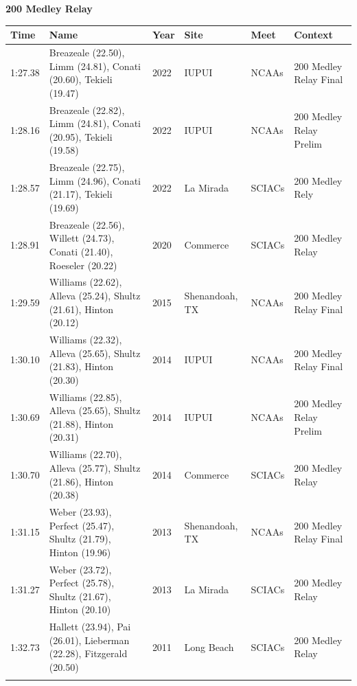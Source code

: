 \noindent\begin{minipage}[t]{0.98\textwidth}
\centering
\textbf{\textcolor{teamprimary}{200 Medley Relay}}\par
\vspace{0.5em}
\centering
\small
\renewcommand{\arraystretch}{1.0}
\setlength{\tabcolsep}{4pt}
\begin{tabular}{@{}p{2.0cm}p{3.2cm}p{1.2cm}p{2.0cm}p{2.0cm}p{2.5cm}@{}}
\toprule
\textbf{Time} & \textbf{Name} & \textbf{Year} & \textbf{Site} & \textbf{Meet} & \textbf{Context} \\
\midrule
1:27.38 & Breazeale (22.50), Limm (24.81), Conati (20.60), Tekieli (19.47) & 2022 & IUPUI & NCAAs & 200 Medley Relay Final \\
1:28.16 & Breazeale (22.82), Limm (24.81), Conati (20.95), Tekieli (19.58) & 2022 & IUPUI & NCAAs & 200 Medley Relay Prelim \\
1:28.57 & Breazeale (22.75), Limm (24.96), Conati (21.17), Tekieli (19.69) & 2022 & La Mirada & SCIACs & 200 Medley Rely \\
1:28.91 & Breazeale (22.56), Willett (24.73), Conati (21.40), Roeseler (20.22) & 2020 & Commerce & SCIACs & 200 Medley Relay \\
1:29.59 & Williams (22.62), Alleva (25.24), Shultz (21.61), Hinton (20.12) & 2015 & Shenandoah, TX & NCAAs & 200 Medley Relay Final \\
1:30.10 & Williams (22.32), Alleva (25.65), Shultz (21.83), Hinton (20.30) & 2014 & IUPUI & NCAAs & 200 Medley Relay Final \\
1:30.69 & Williams (22.85), Alleva (25.65), Shultz (21.88), Hinton (20.31) & 2014 & IUPUI & NCAAs & 200 Medley Relay Prelim \\
1:30.70 & Williams (22.70), Alleva (25.77), Shultz (21.86), Hinton (20.38) & 2014 & Commerce & SCIACs & 200 Medley Relay \\
1:31.15 & Weber (23.93), Perfect (25.47), Shultz (21.79), Hinton (19.96) & 2013 & Shenandoah, TX & NCAAs & 200 Medley Relay Final \\
1:31.27 & Weber (23.72), Perfect (25.78), Shultz (21.67), Hinton (20.10) & 2013 & La Mirada & SCIACs & 200 Medley Relay \\
1:32.73 & Hallett (23.94), Pai (26.01), Lieberman (22.28), Fitzgerald (20.50) & 2011 & Long Beach & SCIACs & 200 Medley Relay \\
\bottomrule
\vspace{0.5em}
\end{tabular}
\end{minipage}

